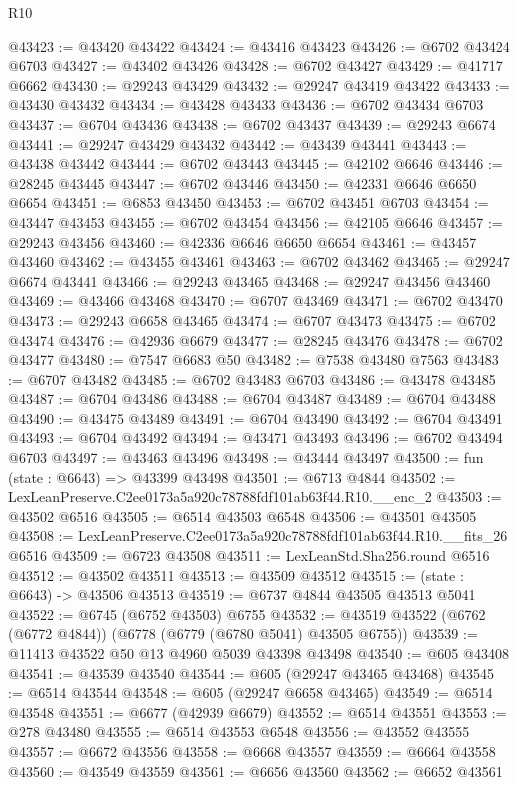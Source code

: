 \begin{lexlean}{R10}
\begin{coremodule}
@43423 := @43420 @43422
@43424 := @43416 @43423
@43426 := @6702 @43424 @6703
@43427 := @43402 @43426
@43428 := @6702 @43427
@43429 := @41717 @6662
@43430 := @29243 @43429
@43432 := @29247 @43419 @43422
@43433 := @43430 @43432
@43434 := @43428 @43433
@43436 := @6702 @43434 @6703
@43437 := @6704 @43436
@43438 := @6702 @43437
@43439 := @29243 @6674
@43441 := @29247 @43429 @43432
@43442 := @43439 @43441
@43443 := @43438 @43442
@43444 := @6702 @43443
@43445 := @42102 @6646
@43446 := @28245 @43445
@43447 := @6702 @43446
@43450 := @42331 @6646 @6650 @6654
@43451 := @6853 @43450
@43453 := @6702 @43451 @6703
@43454 := @43447 @43453
@43455 := @6702 @43454
@43456 := @42105 @6646
@43457 := @29243 @43456
@43460 := @42336 @6646 @6650 @6654
@43461 := @43457 @43460
@43462 := @43455 @43461
@43463 := @6702 @43462
@43465 := @29247 @6674 @43441
@43466 := @29243 @43465
@43468 := @29247 @43456 @43460
@43469 := @43466 @43468
@43470 := @6707 @43469
@43471 := @6702 @43470
@43473 := @29243 @6658 @43465
@43474 := @6707 @43473
@43475 := @6702 @43474
@43476 := @42936 @6679
@43477 := @28245 @43476
@43478 := @6702 @43477
@43480 := @7547 @6683 @50
@43482 := @7538 @43480 @7563
@43483 := @6707 @43482
@43485 := @6702 @43483 @6703
@43486 := @43478 @43485
@43487 := @6704 @43486
@43488 := @6704 @43487
@43489 := @6704 @43488
@43490 := @43475 @43489
@43491 := @6704 @43490
@43492 := @6704 @43491
@43493 := @6704 @43492
@43494 := @43471 @43493
@43496 := @6702 @43494 @6703
@43497 := @43463 @43496
@43498 := @43444 @43497
@43500 := fun (state : @6643) => @43399 @43498
@43501 := @6713 @4844
@43502 := LexLeanPreserve.C2ee0173a5a920c78788fdf101ab63f44.R10.__enc_2
@43503 := @43502 @6516
@43505 := @6514 @43503 @6548
@43506 := @43501 @43505
@43508 := LexLeanPreserve.C2ee0173a5a920c78788fdf101ab63f44.R10.__fits_26 @6516
@43509 := @6723 @43508
@43511 := LexLeanStd.Sha256.round @6516
@43512 := @43502 @43511
@43513 := @43509 @43512
@43515 := (state : @6643) -> @43506 @43513
@43519 := @6737 @4844 @43505 @43513 @5041
@43522 := @6745 (@6752 @43503) @6755
@43532 := @43519 @43522 (@6762 (@6772 @4844)) (@6778 (@6779 (@6780 @5041) @43505 @6755))
@43539 := @11413 @43522 @50 @13 @4960 @5039 @43398 @43498
@43540 := @605 @43408
@43541 := @43539 @43540
@43544 := @605 (@29247 @43465 @43468)
@43545 := @6514 @43544
@43548 := @605 (@29247 @6658 @43465)
@43549 := @6514 @43548
@43551 := @6677 (@42939 @6679)
@43552 := @6514 @43551
@43553 := @278 @43480
@43555 := @6514 @43553 @6548
@43556 := @43552 @43555
@43557 := @6672 @43556
@43558 := @6668 @43557
@43559 := @6664 @43558
@43560 := @43549 @43559
@43561 := @6656 @43560
@43562 := @6652 @43561

\end{coremodule}
\end{lexlean}
